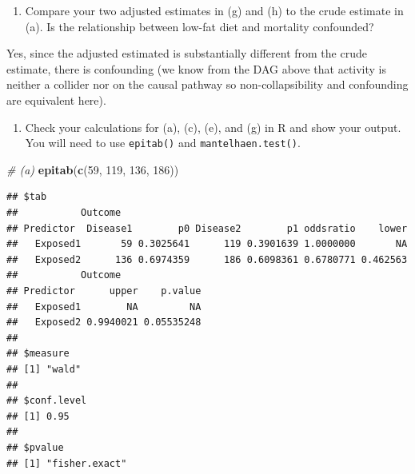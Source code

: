 \documentclass[]{article}
\newenvironment{Shaded}{\begin{snugshade}}{\end{snugshade}}
\newcommand{\KeywordTok}[1]{\textcolor[rgb]{0.13,0.29,0.53}{\textbf{#1}}}
\newcommand{\DecValTok}[1]{\textcolor[rgb]{0.00,0.00,0.81}{#1}}
\newcommand{\CommentTok}[1]{\textcolor[rgb]{0.56,0.35,0.01}{\textit{#1}}}
\newcommand{\OperatorTok}[1]{\textcolor[rgb]{0.81,0.36,0.00}{\textbf{#1}}}
\newcommand{\NormalTok}[1]{#1}
\providecommand{\tightlist}{%
  \setlength{\itemsep}{0pt}\setlength{\parskip}{0pt}}
\begin{document}
\begin{enumerate}
\def\labelenumi{(\roman{enumi})}
\tightlist
\item
  Compare your two adjusted estimates in (g) and (h) to the crude
  estimate in (a). Is the relationship between low-fat diet and
  mortality confounded?
\end{enumerate}

Yes, since the adjusted estimated is substantially different from the
crude estimate, there is confounding (we know from the DAG above that
activity is neither a collider nor on the causal pathway so
non-collapsibility and confounding are equivalent here).

\begin{enumerate}
\def\labelenumi{(\alph{enumi})}
\setcounter{enumi}{9}
\tightlist
\item
  Check your calculations for (a), (c), (e), and (g) in R and show your
  output. You will need to use \texttt{epitab()} and
  \texttt{mantelhaen.test()}.
\end{enumerate}

\begin{Shaded}
\begin{Highlighting}[]
\CommentTok{# (a)}
\KeywordTok{epitab}\NormalTok{(}\KeywordTok{c}\NormalTok{(}\DecValTok{59}\NormalTok{, }\DecValTok{119}\NormalTok{, }\DecValTok{136}\NormalTok{, }\DecValTok{186}\NormalTok{))}
\end{Highlighting}
\end{Shaded}

\begin{verbatim}
## $tab
##           Outcome
## Predictor  Disease1        p0 Disease2        p1 oddsratio    lower
##   Exposed1       59 0.3025641      119 0.3901639 1.0000000       NA
##   Exposed2      136 0.6974359      186 0.6098361 0.6780771 0.462563
##           Outcome
## Predictor      upper    p.value
##   Exposed1        NA         NA
##   Exposed2 0.9940021 0.05535248
## 
## $measure
## [1] "wald"
## 
## $conf.level
## [1] 0.95
## 
## $pvalue
## [1] "fisher.exact"
\end{verbatim}

\begin{Shaded}
\end{Shaded}
\end{document}
